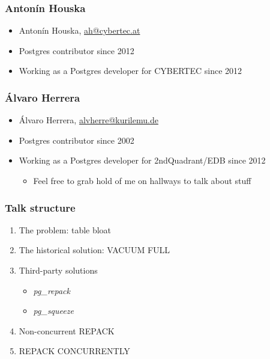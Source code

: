 \newcommand{\linksize}{\scriptsize}


\begin{frame}[plain]
  \titlepage
\end{frame}


\begin{frame}
	\frametitle{Antonín Houska}
  \begin{itemize}
    \item Antonín Houska, \href{mailto:ah@cybertec.at}{ah@cybertec.at}
    \item Postgres contributor since 2012
    \item Working as a Postgres developer for CYBERTEC since 2012
  \end{itemize}
\end{frame}

\begin{frame}
	\frametitle{Álvaro Herrera}
  \begin{itemize}
    \item Álvaro Herrera, \href{mailto:alvherre@kurilemu.de}{alvherre@kurilemu.de}
    \item Postgres contributor since 2002
    \item Working as a Postgres developer for 2ndQuadrant/EDB since 2012
\begin{itemize} \item \linksize Feel free to grab hold of me on hallways to talk about stuff \end{itemize}
  \end{itemize}
\end{frame}

\begin{frame}
  \frametitle{Talk structure}
  \begin{enumerate}
    \item The problem: table bloat
    \item The historical solution: VACUUM FULL
    \item Third-party solutions
	    \begin{itemize}
		    \item \emph{pg\_repack}
		    \item \emph{pg\_squeeze}
	    \end{itemize}
    \item Non-concurrent REPACK
    \item REPACK CONCURRENTLY
  \end{enumerate}
\end{frame}

